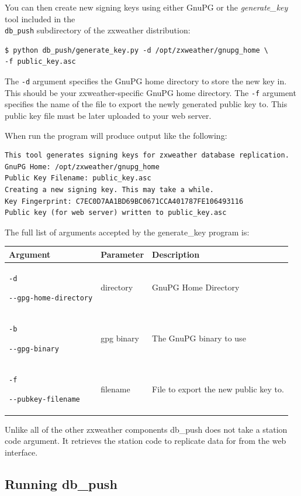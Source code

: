 \documentclass[a4paper,10pt,draft]{book}
\begin{document}
You can then create new signing keys using either GnuPG or the \emph{generate\_key} tool included in the \\ \verb|db_push| subdirectory of the zxweather distribution:

\begin{verbatim}
$ python db_push/generate_key.py -d /opt/zxweather/gnupg_home \
-f public_key.asc
\end{verbatim}

The \verb|-d| argument specifies the GnuPG home directory to store the new key in. This should be your zxweather-specific GnuPG home directory. The \verb|-f| argument specifies the name of the file to export the newly generated public key to. This public key file must be later uploaded to your web server.

When run the program will produce output like the following:
\begin{verbatim}
This tool generates signing keys for zxweather database replication.
GnuPG Home: /opt/zxweather/gnupg_home
Public Key Filename: public_key.asc
Creating a new signing key. This may take a while.
Key Fingerprint: C7EC0D7AA1BD69BC0671CCA401787FE106493116
Public key (for web server) written to public_key.asc
\end{verbatim}

The full list of arguments accepted by the generate\_key program is:

\begin{tabular}{p{4.2cm} l p{7.9cm}}
\hline
\textbf{Argument} & \textbf{Parameter} & \textbf{Description} \\
\hline

\verb|-d| \par \verb|--gpg-home-directory| & directory & GnuPG Home Directory \\

\verb|-b| \par \verb|--gpg-binary| & gpg binary & The GnuPG binary to use \\

\verb|-f| \par \verb|--pubkey-filename| & filename & File to export the new public key to. \\
\hline
\end{tabular}

Unlike all of the other zxweather components db\_push does not take a station code argument. It retrieves the station code to replicate data for from the web interface.

\subsection{Running db\_push}
\end{document}
